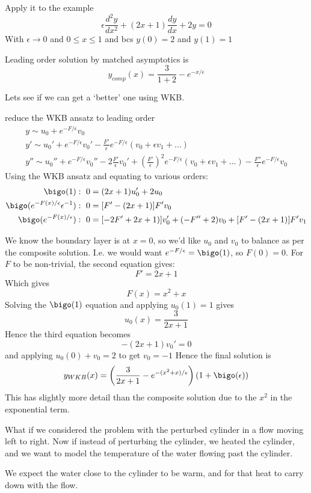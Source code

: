 \documentclass{/home/janmebows/Documents/LatexTemplates/myassignment}
\begin{document}
Apply it to the example
\[\epsilon \frac{d^2y}{dx^2} + (2x+1) \frac{dy}{dx} + 2y = 0\]
With $\epsilon\to 0$ and $0\leq x \leq 1$ and bcs $y(0)=2$ and $y(1)=1$

Leading order solution by matched asymptotics is 
\[y_{comp}(x) = \frac{3}{1+2} - e^{-x/\epsilon}\]

Lets see if we can get a `better' one using WKB.

reduce the WKB ansatz to leading order
\begin{align*}
    y \sim u_0 + e^{-F/\epsilon} v_0\\
    y' \sim u_0' + e^{-F/\epsilon} v_0' -\frac{F'}{\epsilon} e^{-F/\epsilon} (v_0 + \epsilon v_1 +\hdots)\\
    y'' \sim u_0'' + e^{-F/\epsilon} v_0'' - 2\frac{F'}{\epsilon} v_0'+ \left(\frac{F'}{\epsilon}\right)^2 e^{-F/\epsilon}(v_0 + \epsilon v_1 + \hdots) - \frac{F''}{\epsilon} e^{-F/\epsilon} v_0
\end{align*}
Using the WKB ansatz and equating to various orders:
\begin{align*}
    \bigo(1): \ 0&= (2x +1) u_0' + 2u_0\\
    \bigo(e^{-F(x)/\epsilon}\epsilon^{-1}): \ 0 &= [F' - (2x+1)]F'v_0\\
    \bigo(e^{-F(x)/\epsilon}): \ 0 &= [-2F' +2 x +1)]v_0' + (-F'' + 2)v_0 +[F' - (2x+ 1)] F'v_1\\
\end{align*}

We know the boundary layer is at $x=0$, so we'd like $u_0$ and $v_0$ to balance as per the composite solution. I.e. we would want $e^{-F/\epsilon} = \bigo(1)$, so $F(0) = 0$. For $F$ to be non-trivial, the second equation gives:
\[F' = 2x+1\]
Which gives
\[F(x) = x^2 +x\]
Solving the $\bigo(1)$ equation and applying $u_0(1) = 1$ gives
\[u_0(x) = \frac{3}{2x+1}\]
Hence the third equation becomes 
\[-(2x +1)v_0' = 0\]
and applying $u_0(0) + v_0 = 2$ to get $v_0 = -1$
Hence the final solution is
\[y_{WKB}(x) = \left(\frac{3}{2x+1} - e^{-(x^2+x)/\epsilon}\right) (1+\bigo(\epsilon))\]
This has slightly more detail than the composite solution due to the $x^2$ in the exponential term.




What if we considered the problem with the perturbed cylinder in a flow moving left to right.
Now if instead of perturbing the cylinder, we heated the cylinder, and we want to model the temperature of the water flowing past the cylinder. 

We expect the water close to the cylinder to be warm, and for that heat to carry down with the flow.
\end{document}
